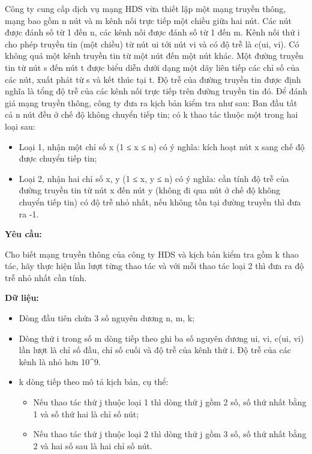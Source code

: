 

Công ty cung cấp dịch vụ mạng HDS vừa thiết lập một mạng truyền thông, mạng bao gồm n nút và m kênh nối trực tiếp một chiều giữa hai nút. Các nút được đánh số từ 1 đến n, các kênh nối được đánh số từ 1 đến m. Kênh nối thứ i cho phép truyền tin (một chiều) từ nút ui tới nút vi và có độ trễ là c(ui, vi). Có không quá một kênh truyền tin từ một nút đến một nút khác. Một đường truyền tin từ nút s đến nút t được biểu diễn dưới dạng một dãy liên tiếp các chỉ số của các nút, xuất phát từ s và kết thúc tại t. Độ trễ của đường truyền tin được định nghĩa là tổng độ trễ của các kênh nối trực tiếp trên đường truyền tin đó. Để đánh giá mạng truyền thông, công ty đưa ra kịch bản kiểm tra như sau: Ban đầu tất cả n nút đều ở chế độ không chuyển tiếp tin; có k thao tác thuộc một trong hai loại sau:
\begin{itemize}
	\item Loại 1, nhận một chỉ số x (1 ≤ x ≤ n) có ý nghĩa: kích hoạt nút x sang chế độ được chuyển tiếp tin;
	\item Loại 2, nhận hai chỉ số x, y (1 ≤ x, y ≤ n) có ý nghĩa: cần tính độ trễ của đường truyền tin từ nút x đến nút y (không đi qua nút ở chế độ không chuyển tiếp tin) có độ trễ nhỏ nhất, nếu không tồn tại đường truyền thì đưa ra -1.
\end{itemize}

\textbf{Yêu cầu:}

Cho biết mạng truyền thông của công ty HDS và kịch bản kiểm tra gồm k thao tác, hãy thực hiện lần lượt từng thao tác và với mỗi thao tác loại 2 thì đưa ra độ trễ nhỏ nhất cần tính.

\textbf{Dữ liệu:}
\begin{itemize}
	\item Dòng đầu tiên chứa 3 số nguyên dương n, m, k;
	\item Dòng thứ i trong số m dòng tiếp theo ghi ba số nguyên dương ui, vi, c(ui, vi) lần lượt là chỉ số đầu, chỉ số cuối và độ trễ của kênh thứ i. Độ trễ của các kênh là nhỏ hơn 10\textasciicircum9.
	\item k dòng tiếp theo mô tả kịch bản, cụ thể:
\begin{itemize}
	\item Nếu thao tác thứ j thuộc loại 1 thì dòng thứ j gồm 2 số, số thứ nhất bằng 1 và số thứ hai là chỉ số nút;
	\item Nếu thao tác thứ j thuộc loại 2 thì dòng thứ j gồm 3 số, số thứ nhất bằng 2 và hai số sau là hai chỉ số nút.
\end{itemize}
\end{itemize}

